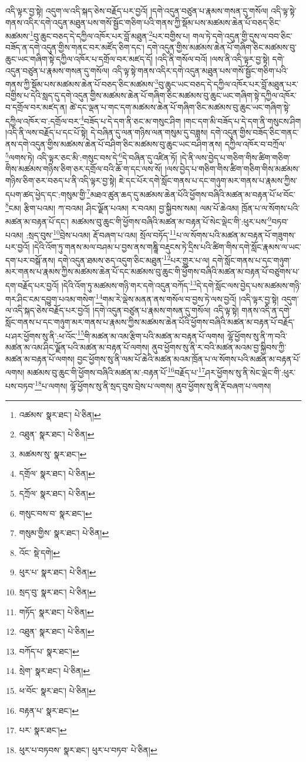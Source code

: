 འདི་ལྟར་བྱ་སྟེ། འདུག་ལ་འདི་སྐད་ཅེས་བརྗོད་པར་བྱའོ། །དགེ་འདུན་བཙུན་པ་རྣམས་གསན་དུ་གསོལ། འདི་ལྟ་སྟེ་གནས་འདིར་དགེ་འདུན་མཐུན་པས་གསོ་སྦྱོང་གཅིག་པའི་གནས་ཀྱི་སྡོམ་པས་མཚམས་ཆེན་པོ་བཅད་ཅིང་མཚམས་\footnote{འཚམས་  སྣར་ཐང་།  པེ་ཅིན། }བུ་ཆུང་བཅད་དེ་དཀྱིལ་འཁོར་པར་བློ་མཐུན་\footnote{འཐུན་  སྣར་ཐང་།  པེ་ཅིན། }པར་བགྱིས་པ། གལ་ཏེ་དགེ་འདུན་གྱི་དུས་ལ་བབ་ཅིང་བཟོད་ན་དགེ་འདུན་གྱིས་གནང་བར་མཛོད་ཅིག་དང་། དགེ་འདུན་གྱིས་མཚམས་ཆེན་པོ་གཞིག་ཅིང་མཚམས་བུ་ཆུང་ཡང་གཞིག་སྟེ་དཀྱིལ་འཁོར་པ་དགྲོལ་བར་མཛད་དོ། །འདི་ནི་གསོལ་བའོ། །ལས་ནི་འདི་ལྟར་བྱ་སྟེ། དགེ་འདུན་བཙུན་པ་རྣམས་གསན་དུ་གསོལ། འདི་ལྟ་སྟེ་གནས་འདིར་དགེ་འདུན་མཐུན་པས་གསོ་སྦྱོང་གཅིག་པའི་གནས་ཀྱི་སྡོམ་པས་མཚམས་ཆེན་པོ་བཅད་ཅིང་མཚམས་\footnote{མཚམས་སུ་  སྣར་ཐང་། }བུ་ཆུང་ཡང་བཅད་དེ་དཀྱིལ་འཁོར་པར་བློ་མཐུན་པར་བགྱིས་པ་དེའི་སླད་དུ་དགེ་འདུན་གྱིས་མཚམས་ཆེན་པོ་གཞིག་ཅིང་མཚམས་བུ་ཆུང་ཡང་གཞིག་སྟེ་དཀྱིལ་འཁོར་བ་དགྲོལ་བར་མཛད་ན། ཚེ་དང་ལྡན་པ་གང་དག་མཚམས་ཆེན་པོ་གཞིག་ཅིང་མཚམས་བུ་ཆུང་ཡང་གཞིག་སྟེ་དཀྱིལ་འཁོར་བ་:དགྲོལ་བར་\footnote{དགྲོལ་  སྣར་ཐང་།  པེ་ཅིན། }བཟོད་པ་དེ་དག་ནི་ཅང་མ་གསུང་ཤིག །གང་དག་མི་བཟོད་པ་དེ་དག་ནི་གསུངས་ཤིག །འདི་ནི་ལས་བརྗོད་པ་དང་པོ་སྟེ། དེ་བཞིན་དུ་ལན་གཉིས་ལན་གསུམ་དུ་བཟླས། དགེ་འདུན་གྱིས་བཟོད་ཅིང་གནང་ནས་དགེ་འདུན་གྱིས་མཚམས་ཆེན་པོ་བཤིག་ཅིང་མཚམས་བུ་ཆུང་ཡང་བཤིག་ནས། དཀྱིལ་འཁོར་བ་བཀྲོལ་\footnote{དཀྲོལ་  སྣར་ཐང་།  པེ་ཅིན། }ལགས་ཏེ། འདི་ལྟར་ཅང་མི་:གསུང་བས་དེ་\footnote{གསུང་བས་བ་  སྣར་ཐང་། }དེ་བཞིན་དུ་འཛིན་ཏོ། །དེ་ནི་ལས་བྱེད་པ་གཅིག་གིས་ཚིག་གཅིག་གིས་མཚམས་གཉིས་ཅིག་ཅར་དགྲོལ་བའི་ཆོ་ག་དང་ལས་སོ། །ལས་བྱེད་པ་གཅིག་གིས་ཚིག་གཅིག་གིས་མཚམས་གཉིས་ཅིག་ཅར་བཅད་པ་ནི་འདི་ལྟར་བྱ་སྟེ། ཇེ་དང་པོར་དགེ་སློང་གནས་པ་དང་གཉུག་མར་གནས་པ་རྣམས་ཀྱིས་དཔག་ཚད་ཕྱེད་དང་:གསུམ་གྱི་\footnote{གསུམ་གྱིས་  སྣར་ཐང་།  པེ་ཅིན། }མཐའ་ཚུན་ཆད་དུ་མཚམས་ཆེན་པོའི་ཕྱོགས་བཞིའི་མཚན་མ་བརྟན་པོ་ཕ་བོང་\footnote{འོང་  སྡེ་དགེ། }ངམ། རྩིག་པའམ། ཀ་བའམ། ཤིང་ལྗོན་པའམ། ར་བའམ། བྱ་སྐྱིབས་སམ། ལམ་པོ་ཆེའམ། ཁྲོན་པ་ལ་སོགས་པའི་མཚན་མ་བརྟན་པོ་དང་། མཚམས་བུ་ཆུང་གི་ཕྱོགས་བཞིའི་མཚན་མ་བརྟན་པོ་སེང་ལྡེང་གི་:ཕུར་པས་\footnote{ཕུར་པ་  སྣར་ཐང་།  པེ་ཅིན། }བཏབ་པའམ། :སྲད་བུས་\footnote{སྲད་བུ་  སྣར་ཐང་།  པེ་ཅིན། }བྲེས་པའམ། རྡོ་བཞག་པ་འམ། སྲོལ་བཏོད་\footnote{གཏོད་  སྣར་ཐང་།  པེ་ཅིན། }པ་ལ་སོགས་པའི་མཚན་མ་བརྟན་པོ་གཟུགས་པར་བྱའོ། །དེའི་འོག་ཏུ་གནས་མལ་བཤམ་པ་བྱས་ནས་གཎྜཱི་བརྡུངས་ཏེ་དྲིས་པའི་ཚིག་གིས་དགེ་སློང་རྣམས་ལ་ཡང་དག་པར་བསྒོ་ནས། དགེ་འདུན་ཐམས་ཅད་འདུག་ཅིང་མཐུན་\footnote{འཐུན་  སྣར་ཐང་།  པེ་ཅིན། }པར་གྱུར་པ་ལ། དགེ་སློང་གནས་པ་དང་གཉུག་མར་གནས་པ་རྣམས་ཀྱིས་མཚམས་ཆེན་པོ་དང་མཚམས་བུ་ཆུང་གི་ཕྱོགས་བཞིའི་མཚན་མ་བརྟན་པོ་བཙུགས་པ་དག་བརྗོད་པར་བྱའོ། །དེའི་འོག་ཏུ་མཚམས་གཉི་གར་དགེ་འདུན་བཀོད་\footnote{བཀོད་པ་  སྣར་ཐང་། }དེ་དགེ་སློང་ལས་བྱེད་པས་མཚམས་གཉི་གར་ཤིང་ངམ་དབྱུག་པའམ་གསེག་\footnote{སྲེག་  སྣར་ཐང་།  པེ་ཅིན། }གམ་རེ་ལྡེས་མནན་ནས་གསོལ་བ་བྱས་ཏེ་ལས་བྱའོ། །འདི་ལྟར་བྱ་སྟེ། འདུག་ལ་འདི་སྐད་ཅེས་བརྗོད་པར་བྱའོ། །དགེ་འདུན་བཙུན་པ་རྣམས་གསན་དུ་གསོལ། འདི་ལྟ་སྟེ། གནས་འདི་ན་དགེ་སློང་གནས་པ་དང་གཉུག་མར་གནས་པ་རྣམས་ཀྱིས་མཚམས་ཆེན་པོའི་ཕྱོགས་བཞིའི་མཚན་མ་བརྟན་པོ་བརྗོད་པ་ཤར་ཕྱོགས་སུ་ནི་:ཕ་འོང་\footnote{ཕ་བོང་  སྣར་ཐང་།  པེ་ཅིན། }གི་མཚན་མ་འམ་རྩིག་པའི་མཚན་མ་བརྟན་པོ་ལགས། ལྷོ་ཕྱོགས་སུ་ནི་ཀ་བའི་མཚན་མ་འམ་ཤིང་ལྗོན་པའི་མཚན་མ་བརྟན་པོ་ལགས། ནུབ་ཕྱོགས་སུ་ནི་ར་བའི་མཚན་མའམ་བྱ་སྐྱིབས་ཀྱི་མཚན་མ་བརྟན་པོ་ལགས། བྱང་ཕྱོགས་སུ་ནི་ལམ་པོ་ཆེའི་མཚན་མའམ་ཁྲོན་པ་ལ་སོགས་པའི་མཚན་མ་བརྟན་པོ་ལགས། མཚམས་བུ་ཆུང་གི་ཕྱོགས་བཞིའི་མཚན་མ་:བརྟན་པོ་\footnote{བརྟན་པ་  སྣར་ཐང་། }བརྗོད་པ་\footnote{པར་  སྣར་ཐང་། }ཤར་ཕྱོགས་སུ་ནི་སེང་ལྡེང་གི་:ཕུར་པས་བཏབ་\footnote{ཕུར་པ་བཏབས་  སྣར་ཐང་། ཕུར་པ་བཏབ་  པེ་ཅིན། }པ་ལགས། ལྷོ་ཕྱོགས་སུ་ནི་སྲད་བུས་བྲེས་པ་ལགས། ནུབ་ཕྱོགས་སུ་ནི་རྡོ་བཞག་པ་ལགས། 